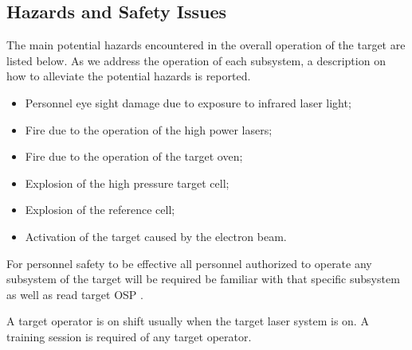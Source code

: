 \begin{safetyen}{10}{5}
\section{Hazards and Safety Issues}
\label{sec:haz}

The main potential hazards encountered in the overall operation of the
target are listed below.
As we address the operation of each subsystem, a description on how to
alleviate the potential
hazards is reported. 

\begin{itemize}
  \item Personnel eye sight damage due to exposure to infrared laser light;
  \item Fire due to the operation of the high power lasers;
  \item Fire due to the operation of the target oven;
  \item Explosion of the high pressure target cell;
  \item Explosion of the reference cell;
  \item Activation of the target caused by the electron beam.
\end{itemize}

For personnel safety to be effective all personnel authorized to operate
any subsystem of the target will be required  be familiar with that 
specific subsystem as well as read 
  target OSP%
.

A target operator is on shift usually when the target laser system is on.
A training session is required of any target operator. 

\end{safetyen}

